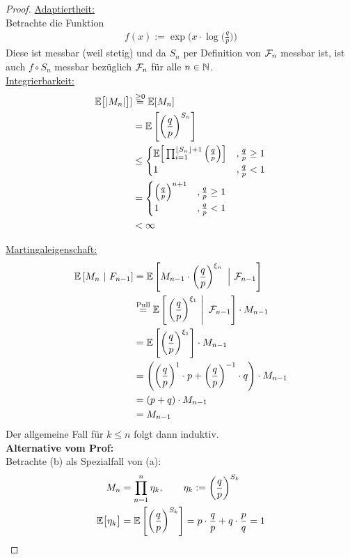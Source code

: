 \documentclass[12pt,a4paper]{article}
\begin{document}
\begin{proof}
	\underline{Adaptiertheit:}\\
	Betrachte die Funktion
	\begin{align*}
		f(x):= \exp\Big(x\cdot\log\Big(\frac{q}{p}\Big)\Big)
	\end{align*}
	Diese ist messbar (weil stetig) und da $S_n$ per Definition von $\mathcal{F}_n$ messbar ist, ist auch
	$f\circ S_n$ messbar bezüglich $\mathcal{F}_n$ für alle $n\in\mathbb{N}$.\\

	\underline{Integrierbarkeit:} %
	\begin{align*}
		\mathbb{E}\big[|M_n|\big]]
		&\stackrel{\geq0}{=}\mathbb{E}[M_n]\\
		&= \mathbb{E}\left[\left(\frac{q}{p}\right)^{S_n}\right] \\
		&\leq\begin{cases}
		\mathbb{E}\Big[\prod_{i=1}^{\lfloor S_n\rfloor + 1}\Big(\frac{q}{p}\Big)\Big] &,\frac{q}{p}\geq 1 \\
		1 &,\frac{q}{p} < 1 
	\end{cases} \\
		&=\begin{cases}
	\Big(\frac{q}{p}\Big)^{n+1} &,\frac{q}{p}\geq 1 \\
		1 &,\frac{q}{p} < 1 
	\end{cases} \\
	&< \infty
	\end{align*}

	\underline{Martingaleigenschaft:}
	\begin{align*}
		\mathbb{E}\left[{M_n}~|~{F_{n-1}}\right]
		&=\mathbb{E}\left[M_{n-1}\cdot\left(\frac{q}{p}\right)^{\xi_n}~\Big|~\mathcal{F}_{n-1}\right] \\
		&\stackrel{\text{Pull}}{=}
	\mathbb{E}\left[\left.\left(\frac{q}{p}\right)^{\xi_1}~\right|~\mathcal{F}_{n-1}\right]\cdot M_{n-1} \\
	&\stackrel{\text{}}{=}
	\mathbb{E}\left[\left(\frac{q}{p}\right)^{\xi_1}\right]\cdot M_{n-1} \\
		&=\left(\left(\frac{q}{p}\right)^1\cdot p + \left(\frac{q}{p}\right)^{-1}\cdot q\right)\cdot M_{n-1} \\
		&= (p+q)\cdot M_{n-1} \\
		&= M_{n-1}
	\end{align*}
Der allgemeine Fall für $k\leq n$ folgt dann induktiv.\\

\textbf{Alternative vom Prof:}\\
Betrachte (b) als Spezialfall von (a):
\begin{align*}
M_n&=\prod\limits_{n=1}^n \eta_k,\qquad\eta_k:=\left(\frac{q}{p}\right)^{S_k}\\
\mathbb{E}\big[\eta_k\big]&=\mathbb{E}\left[\left(\frac{q}{p}\right)^{S_k}\right]=p\cdot\frac{q}{p}+q\cdot\frac{p}{q}=1
\end{align*}
\end{proof}
\end{document}
